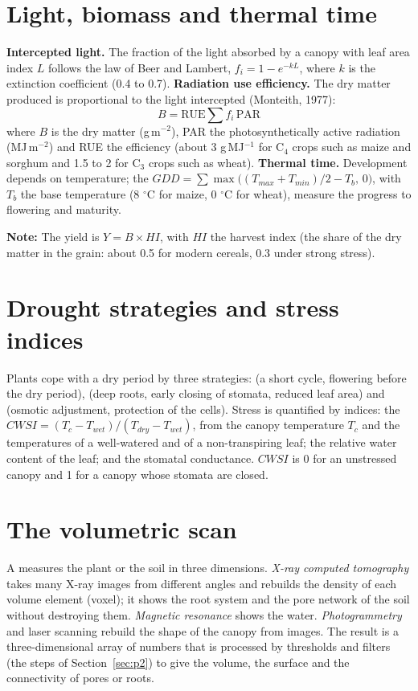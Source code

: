 \section{Light, biomass and thermal time}
\textbf{Intercepted light.} The fraction of the light absorbed by a canopy with leaf area index $L$ follows the law of Beer and Lambert, $f_i=1-e^{-kL}$, where $k$ is the extinction coefficient (0.4 to 0.7). \textbf{Radiation use efficiency.} The dry matter produced is proportional to the light intercepted (Monteith, 1977):
\begin{equation*}\boxed{B=\mathrm{RUE}\sum f_i\,\mathrm{PAR}}\end{equation*}
where $B$ is the dry matter (g\,m$^{-2}$), PAR the photosynthetically active radiation (MJ\,m$^{-2}$) and RUE the efficiency (about 3 g\,MJ$^{-1}$ for C$_4$ crops such as maize and sorghum and 1.5 to 2 for C$_3$ crops such as wheat). \textbf{Thermal time.} Development depends on temperature; the  $GDD=\sum\max\bigl((T_{max}+T_{min})/2-T_b,\,0\bigr)$, with $T_b$ the base temperature (8 $^\circ$C for maize, 0 $^\circ$C for wheat), measure the progress to flowering and maturity.
\par\noindent \textbf{Note:} The yield is $Y=B\times HI$, with $HI$ the harvest index (the share of the dry matter in the grain: about 0.5 for modern cereals, 0.3 under strong stress).

\section{Drought strategies and stress indices}
Plants cope with a dry period by three strategies:  (a short cycle, flowering before the dry period),  (deep roots, early closing of stomata, reduced leaf area) and  (osmotic adjustment, protection of the cells). Stress is quantified by indices: the  $CWSI=(T_c-T_{wet})/(T_{dry}-T_{wet})$, from the canopy temperature $T_c$ and the temperatures of a well-watered and of a non-transpiring leaf; the relative water content of the leaf; and the stomatal conductance. $CWSI$ is 0 for an unstressed canopy and 1 for a canopy whose stomata are closed.

\section{The volumetric scan}
A  measures the plant or the soil in three dimensions. \emph{X-ray computed tomography} takes many X-ray images from different angles and rebuilds the density of each volume element (voxel); it shows the root system and the pore network of the soil without destroying them. \emph{Magnetic resonance} shows the water. \emph{Photogrammetry} and laser scanning rebuild the shape of the canopy from images. The result is a three-dimensional array of numbers that is processed by thresholds and filters (the steps of Section~\ref{sec:p2}) to give the volume, the surface and the connectivity of pores or roots.
